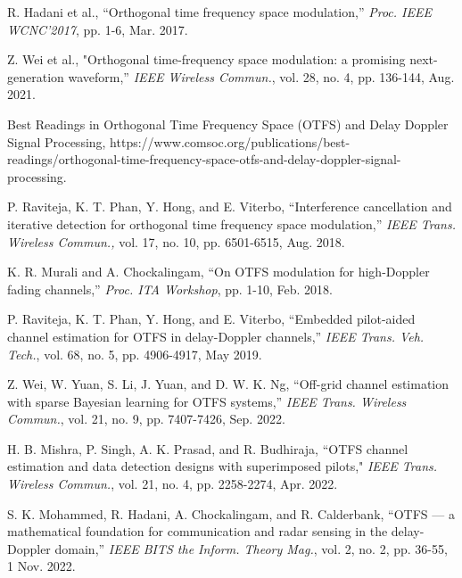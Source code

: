 \vspace{-2mm}
\begin{thebibliography}{99}
R. Hadani et al., ``Orthogonal time frequency space modulation,'' {\em Proc. IEEE WCNC’2017}, pp. 1-6, Mar. 2017.

\vspace{-2mm}
Z. Wei et al., "Orthogonal time-frequency space modulation: a promising next-generation waveform,'' {\it IEEE Wireless Commun.}, vol. 28, no. 4, pp. 136-144, Aug. 2021.

\vspace{-2mm}
Best Readings in Orthogonal Time Frequency Space (OTFS) and Delay Doppler Signal Processing, 
https://www.comsoc.org/publications/best-readings/orthogonal-time-frequency-space-otfs-and-delay-doppler-signal-processing.

\vspace{-2mm}
P. Raviteja, K. T. Phan, Y. Hong, and E. Viterbo, ``Interference cancellation and iterative detection for orthogonal time frequency space modulation,'' {\em IEEE Trans. Wireless Commun.,} vol. 17, no. 10, pp. 6501-6515, Aug. 2018.

\vspace{-2mm}
K. R. Murali and A. Chockalingam, ``On OTFS modulation for high-Doppler fading channels,'' {\it Proc. ITA Workshop}, pp. 1-10, Feb. 2018. 

\vspace{-2mm}
P. Raviteja, K. T. Phan, Y. Hong, and E. Viterbo, ``Embedded pilot-aided channel estimation for OTFS in delay-Doppler channels,'' {\it IEEE Trans. Veh. Tech.}, vol. 68, no. 5, pp. 4906-4917, May 2019.

\vspace{-2mm}
Z. Wei, W. Yuan, S. Li, J. Yuan, and D. W. K. Ng, ``Off-grid channel estimation with sparse Bayesian learning for OTFS systems,'' {\it IEEE Trans. Wireless Commun.}, vol. 21, no. 9, pp. 7407-7426, Sep. 2022.

\vspace{-2mm}
H. B. Mishra, P. Singh, A. K. Prasad, and R. Budhiraja, ``OTFS channel estimation and data detection designs with superimposed pilots," \textit{IEEE Trans. Wireless Commun.}, vol. 21, no. 4, pp. 2258-2274, Apr. 2022.

\vspace{-2mm}
S. K. Mohammed, R. Hadani, A. Chockalingam, and R. Calderbank, ``OTFS — a mathematical foundation for communication and radar sensing in the delay-Doppler domain,'' {\it IEEE BITS the Inform. Theory Mag.}, vol. 2, no. 2, pp. 36-55, 1 Nov. 2022.


\end{thebibliography}

